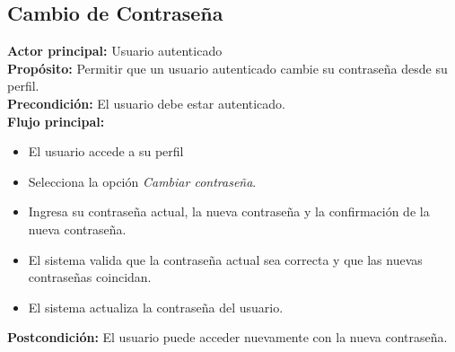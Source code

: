 \subsection{Cambio de Contraseña}
\textbf{Actor principal:} Usuario autenticado\\
\textbf{Propósito:} Permitir que un usuario autenticado cambie su contraseña desde su perfil.\\
\textbf{Precondición:} El usuario debe estar autenticado.\\
\textbf{Flujo principal:}
\begin{itemize}
    \item El usuario accede a su perfil
    \item Selecciona la opción \textit{Cambiar contraseña}.
    \item Ingresa su contraseña actual, la nueva contraseña y la confirmación de la nueva contraseña.
    \item El sistema valida que la contraseña actual sea correcta y que las nuevas contraseñas coincidan.
    \item El sistema actualiza la contraseña del usuario.
\end{itemize}
\textbf{Postcondición:} El usuario puede acceder nuevamente con la nueva contraseña.\\


